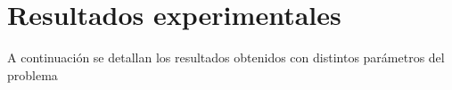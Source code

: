 \section{Resultados experimentales}
A continuación se detallan los resultados obtenidos con distintos parámetros del problema